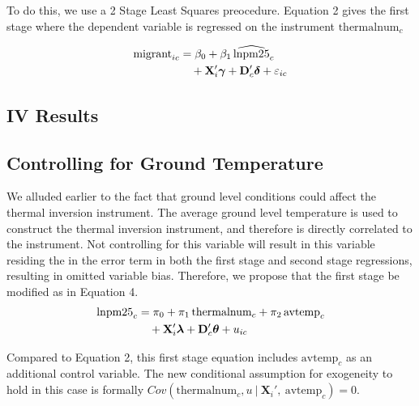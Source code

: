 \documentclass[11pt,twocolumn]{article}
\begin{document}
To do this, we use a 2 Stage Least Squares preocedure. Equation 2 gives the first stage where the dependent variable is regressed on the instrument $\text{thermalnum}_c$

\begin{align}
  \text{migrant}_{ic} &= \beta_0 + \beta_1 \,\widehat{\text{lnpm25}}_c \notag \\
  &\quad + \mathbf{X}_i'\boldsymbol{\gamma} + \mathbf{D}_c'\boldsymbol{\delta} + \varepsilon_{ic} \label{eq:ss}
\end{align}

\subsection{IV Results}




\lipsum[1]

\subsection{Controlling for Ground Temperature}
We alluded earlier to the fact that ground level conditions could affect the thermal inversion instrument. The average ground level temperature is used to construct the thermal inversion instrument, and therefore is directly correlated to the instrument. Not controlling for this variable will result in this variable residing the in the error term in both the first stage and second stage regressions, resulting in omitted variable bias. Therefore, we propose that the first stage be modified as in Equation 4.
\begin{align}
  \text{lnpm25}_c &= \pi_0 + \pi_1 \,\text{thermalnum}_c + \pi_2 \,\text{avtemp}_c \notag \\
  &\quad + \mathbf{X}_i'\boldsymbol{\lambda} + \mathbf{D}_c'\boldsymbol{\theta} + u_{ic}
\end{align}

Compared to Equation 2, this first stage equation includes $\text{avtemp}_c$ as an additional control variable. The new conditional assumption for exogeneity to hold in this case is formally $Cov(\text{thermalnum}_c,u\ |\  \mathbf{X}_i',\ \text{avtemp}_c )=0$.\\
\end{document}
